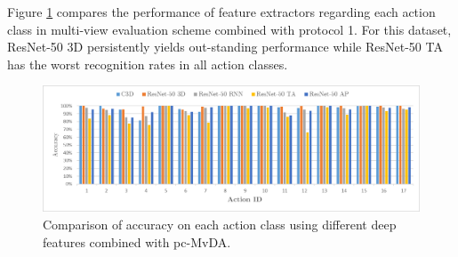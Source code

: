     \begin{table}[htbp]
    \centering
    \caption{Multi-view recognition comparison on MuHAVi dataset.}
    \label{tab:muhavi_multi}
    \end{table}

    Figure \ref{fig:pc-MvDA_confusion_muhavi} compares the performance of feature extractors regarding each action class in multi-view evaluation scheme combined with protocol 1. For this dataset, ResNet-50 3D persistently yields out-standing performance while ResNet-50 TA has the worst recognition rates in all action classes.

    \begin{figure}[htbp]
        \centering
        \includegraphics[width=1.0\linewidth]{figs/pc-MvDA_confusion_muhavi.png}
        \caption{Comparison of accuracy on each action class using different deep features combined with pc-MvDA.}
        \label{fig:pc-MvDA_confusion_muhavi}
    \end{figure}

